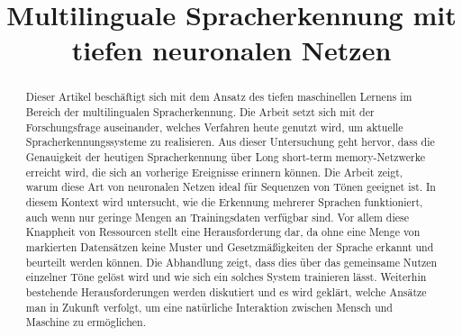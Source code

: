 \documentclass[conference]{IEEEtran}
\begin{document}
	
	\title{Multilinguale Spracherkennung mit tiefen neuronalen
	Netzen\\
	}
	
	\author{
		\and
		\and
	}
	
	\maketitle
	
	\begin{abstract}
	Dieser Artikel beschäftigt sich mit dem Ansatz des tiefen maschinellen Lernens im Bereich der multilingualen Spracherkennung.	Die Arbeit setzt sich mit der Forschungsfrage auseinander, welches Verfahren heute genutzt wird, um aktuelle Spracherkennungssysteme zu realisieren. Aus dieser Untersuchung geht hervor, dass die Genauigkeit der heutigen Spracherkennung über Long short-term memory-Netzwerke erreicht wird, die sich an vorherige Ereignisse erinnern können. Die Arbeit zeigt, warum diese Art von neuronalen Netzen ideal für Sequenzen von Tönen geeignet ist. In diesem Kontext wird untersucht, wie die Erkennung mehrerer Sprachen funktioniert, auch wenn nur geringe Mengen an Trainingsdaten verfügbar sind. Vor allem diese Knappheit von Ressourcen stellt eine Herausforderung dar, da ohne eine Menge von markierten Datensätzen keine Muster und Gesetzmäßigkeiten der Sprache erkannt und beurteilt werden können. Die Abhandlung zeigt, dass dies über das gemeinsame Nutzen einzelner Töne gelöst wird und wie sich ein solches System trainieren lässt. Weiterhin bestehende Herausforderungen werden diskutiert und es wird geklärt, welche Ansätze man in Zukunft verfolgt, um eine natürliche Interaktion zwischen Mensch und Maschine zu ermöglichen.
	\end{abstract}
	
\end{document}
